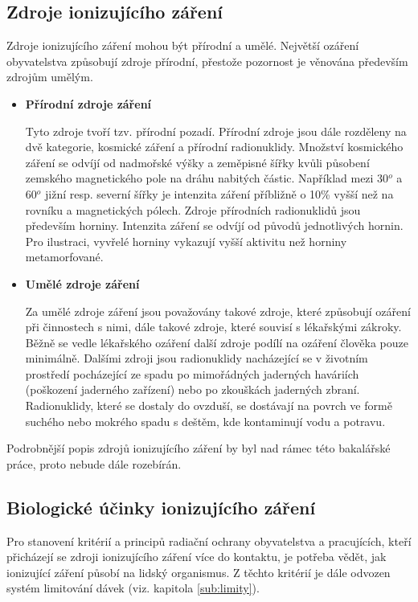 \subsection{Zdroje ionizujícího záření} 
Zdroje ionizujícího záření mohou být přírodní a umělé. Největší ozáření obyvatelstva způsobují zdroje přírodní, přestože pozornost je věnována především zdrojům umělým. \cite{radiobiologie}

\begin{itemize}
	\item \textbf{Přírodní zdroje záření}
	
			Tyto zdroje tvoří tzv. přírodní pozadí. Přírodní zdroje jsou dále rozděleny na dvě kategorie, kosmické záření a přírodní radionuklidy. 
			Množství kosmického záření se odvíjí od nadmořské výšky a zeměpisné šířky kvůli působení zemského magnetického pole na dráhu nabitých částic. Například mezi 30$^{o}$ a 60$^{o}$ jižní resp. severní šířky je intenzita záření příbližně o 10\% vyšší než na rovníku a magnetických pólech. 
			Zdroje přírodních radionuklidů jsou především horniny. Intenzita záření  se odvíjí od původů jednotlivých hornin. Pro ilustraci, vyvřelé horniny vykazují vyšší aktivitu než horniny metamorfované.
	
	\item \textbf{Umělé zdroje záření} 
	
			Za umělé zdroje záření jsou považovány takové zdroje, které způsobují ozáření při činnostech s nimi, dále takové zdroje, které souvisí s lékařskými zákroky. Běžně se vedle lékařského ozáření další zdroje podílí na ozáření člověka pouze minimálně. Dalšími zdroji jsou radionuklidy nacházející se v životním prostředí pocházející ze spadu po mimořádných jaderných haváriích (poškození jaderného zařízení) nebo po zkouškách jaderných zbraní. Radionuklidy, které se dostaly do ovzduší, se dostávají na povrch ve formě suchého nebo mokrého spadu s deštěm, kde kontaminují vodu a potravu.
			
\end{itemize}

Podrobnější popis zdrojů ionizujícího záření by byl nad rámec této bakalářské práce, proto nebude dále rozebírán. 

\subsection{Biologické účinky ionizujícího záření}
Pro stanovení kritérií a principů radiační ochrany obyvatelstva a pracujících, kteří přicházejí se zdroji ionizujícího záření více do kontaktu, je potřeba vědět, jak ionizující záření působí na lidský organismus. Z těchto kritérií je dále odvozen systém limitování dávek (viz. kapitola \ref{sub:limity}). \cite{sujbBiologickeUcinky}

